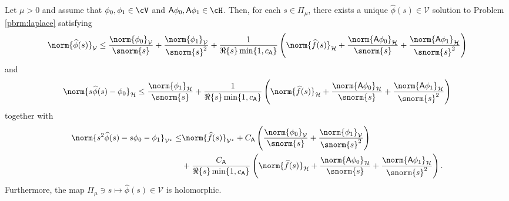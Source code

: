 \begin{proposition}\label{prop:stability_laplace_domain_problem}
Let $\mu>0$ and assume that $\phi_0,\phi_1\in\cV$ and $\mathsf{A}\phi_0, \mathsf{A}\phi_1\in\cH$.
Then, for each $s \in \Pi_{\mu}$, there exists a unique 
$\widehat{\phi}(s) \in \mathcal{V}$ solution to Problem 
\ref{pbrm:laplace} satisfying
\begin{equation}\label{eq:bound_laplace_1}
	\norm{\widehat{\phi}(s)}_{\mathcal{V}}
	\leq
	\frac{\norm{\phi_0}_{\mathcal{V}}}{\snorm{s}}
	+
	\frac{\norm{\phi_1}_{\mathcal{V}}}{\snorm{s}^2}
	+
	\frac{
		1
	}{
		\Re\{s\} \min\{1, c_{\mathsf{A}}\}
	}
	\left(
		\norm{\widehat{f}(s)}_{\mathcal{H}}
		+
		\frac{\norm{\mathsf{A}\phi_0}_{\mathcal{H}}}{\snorm{s}}
		+
		\frac{\norm{\mathsf{A}\phi_1}_{\mathcal{H}}}{\snorm{s}^2}
	\right)
\end{equation}
and
\begin{equation}\label{eq:bound_laplace_2}
    \norm{s \widehat{\phi}(s) -\phi_0}_{\mathcal{H}}
	\leq
	\frac{\norm{\phi_1}_{\mathcal{H}}}{\snorm{s}}
	+
	\frac{
		1
	}{
		\Re\{s\}  \min\{1, c_{\mathsf{A}}\}
	}
	\left(
		\norm{\widehat{f}(s)}_{\mathcal{H}}
		+
		\frac{\norm{\mathsf{A}\phi_0}_{\mathcal{H}}}{\snorm{s}}
		+
		\frac{\norm{\mathsf{A}\phi_1}_{\mathcal{H}}}{\snorm{s}^2}
	\right)
\end{equation}
together with
\begin{equation}\label{eq:bound_laplace_3}
\begin{aligned}
    \norm{s^2 \widehat{\phi}(s) - s \phi_0 -\phi_1}_{\mathcal{V}^\star}
	\leq
	&
	\norm{\widehat{f}(s)}_{\mathcal{V}^\star}
	+ 
	C_{\mathsf{A}}
	\left(
    		\frac{\norm{\phi_0}_{\mathcal{V}}}{\snorm{s}} 
    		+ 
    		\frac{\norm{\phi_1}_{\mathcal{V}}}{\snorm{s}^2} 
	\right)
	\\
	&
	+
	\frac{C_{\mathsf{A}}}{{\Re\{s\}}\min\{1, c_{\mathsf{A}}\}}
	\left(
		\norm{\widehat{f}(s)}_\mathcal{H} 
		+ 
		\frac{\norm{\mathsf{A} \phi_0}_\mathcal{H}}{\snorm{s}} 
		+ 
		\frac{\norm{\mathsf{A} \phi_1}_\mathcal{H}}{\snorm{s}^2} 
	\right).
\end{aligned}
\end{equation}
Furthermore, the map $\Pi_\mu \ni s \mapsto \widehat{\phi}(s) \in \mathcal{V}$
is holomorphic.
\end{proposition}

